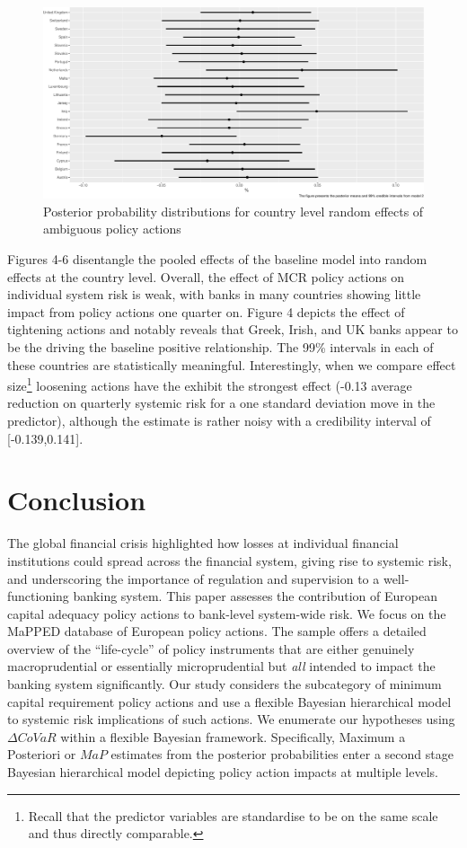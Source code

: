 \documentclass[
  10pt,
]{article}
\begin{document}
\begin{figure}[H]
\includegraphics{figures/paper-fig7-1} \caption{Posterior probability distributions for country level random effects of ambiguous policy actions}\label{fig:fig7}
\end{figure}

Figures 4-6 disentangle the pooled effects of the baseline model into
random effects at the country level. Overall, the effect of MCR policy
actions on individual system risk is weak, with banks in many countries
showing little impact from policy actions one quarter on. Figure 4
depicts the effect of tightening actions and notably reveals that Greek,
Irish, and UK banks appear to be the driving the baseline positive
relationship. The 99\% intervals in each of these countries are
statistically meaningful. Interestingly, when we compare effect
size\footnote{Recall that the predictor variables are standardise to be
  on the same scale and thus directly comparable.} loosening actions
have the exhibit the strongest effect (-0.13 average reduction on
quarterly systemic risk for a one standard deviation move in the
predictor), although the estimate is rather noisy with a credibility
interval of {[}-0.139,0.141{]}.

\hypertarget{conclusion}{%
\section{Conclusion}\label{conclusion}}

The global financial crisis highlighted how losses at individual
financial institutions could spread across the financial system, giving
rise to systemic risk, and underscoring the importance of regulation and
supervision to a well-functioning banking system. This paper assesses
the contribution of European capital adequacy policy actions to
bank-level system-wide risk. We focus on the MaPPED database of European
policy actions. The sample offers a detailed overview of the
``life-cycle'' of policy instruments that are either genuinely
macroprudential or essentially microprudential but \emph{all} intended
to impact the banking system significantly. Our study considers the
subcategory of minimum capital requirement policy actions and use a
flexible Bayesian hierarchical model to systemic risk implications of
such actions. We enumerate our hypotheses using \(\Delta CoVaR\) within
a flexible Bayesian framework. Specifically, Maximum a Posteriori or
\(MaP\) estimates from the posterior probabilities enter a second stage
Bayesian hierarchical model depicting policy action impacts at multiple
levels.
\end{document}
